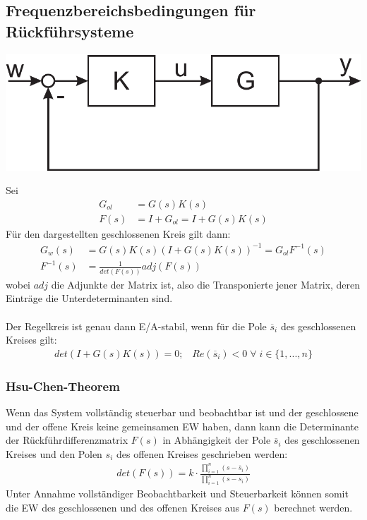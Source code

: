\documentclass[a4paper,twocolumn,10pt]{article}
\begin{document}
\subsection{Frequenzbereichsbedingungen für\\ Rückführsysteme}
\begin{center}
\includegraphics[width=0.8\columnwidth]{Grafiken/Rueckfuehrsysteme_Geschl_Kreis}
\end{center}
Sei
\begin{align*}
G_{ol}&=G(s)K(s)\\
F(s)&=I+G_{ol}=I+G(s)K(s)
\end{align*}
Für den dargestellten geschlossenen Kreis gilt dann:
\begin{align*}
G_w(s)&=G(s)K(s)(I+G(s)K(s))^{-1}=G_{ol}F^{-1}(s)\\
F^{-1}(s)&=\frac{1}{det(F(s))}adj(F(s))
\end{align*}
wobei $adj$ die Adjunkte der Matrix ist, also die Transponierte jener Matrix, deren Einträge die Unterdeterminanten sind.\\\\
Der Regelkreis ist genau dann E/A-stabil, wenn für die Pole $\overline{s}_i$ des geschlossenen Kreises gilt:
\begin{align*}
det(I+G(s)K(s))=0;\;\;\;Re(\overline{s}_i)<0\;\forall\;i\in\{1,...,n\}
\end{align*}

\subsubsection{Hsu-Chen-Theorem}
Wenn das System vollständig steuerbar und beobachtbar ist und der geschlossene und der offene Kreis keine gemeinsamen EW haben, dann kann die Determinante der Rückführdifferenzmatrix $F(s)$ in Abhängigkeit der Pole $\overline{s}_i$ des geschlossenen Kreises und den Polen $s_i$ des offenen Kreises geschrieben werden:
\begin{align*}
det(F(s))=k\cdot\frac{\prod\limits_{i=1}^n(s-\overline{s}_i)}{\prod\limits_{i=1}^n(s-s_i)}
\end{align*}
Unter Annahme vollständiger Beobachtbarkeit und Steuerbarkeit können somit die EW des geschlossenen und des offenen Kreises aus $F(s)$ berechnet werden.
\end{document}
